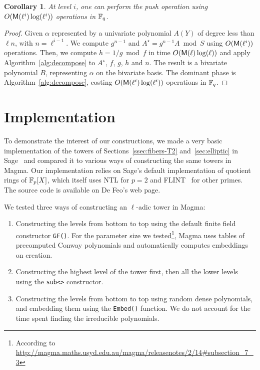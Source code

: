 \documentclass{sig-alternate}
\newtheorem{corollary}[definition]{Corollary}
\begin{document}
\begin{corollary}
  At level $i$, one can perform the push operation using
  $O(\mathsf{M}(\ell^i)\log(\ell^i))$ operations in $\mathbb{F}_q$.
\end{corollary}
\begin{proof}
  Given $\alpha$ represented by a univariate polynomial $A(Y)$ of
  degree less than $\ell n$, with $n =\ell^{i-1}$. We compute
  $g^{n-1}$ and $A^\star = g^{n-1} A \bmod S$ using $O(\mathsf{M}(\ell^i))$
  operations. Then, we compute $h=1/g \bmod f$ in time
  $O(\mathsf{M}(\ell)\log(\ell))$ and apply Algorithm~\ref{alg:decompose}
  to $A^\star$, $f$, $g$, $h$ and $n$. The result is a bivariate
  polynomial $B$, representing $\alpha$ on the bivariate basis. The
  dominant phase is Algorithm~\ref{alg:decompose}, costing
  $O(\mathsf{M}(\ell^i)\log(\ell^i))$ operations in $\mathbb{F}_q$.
\end{proof}


\section{Implementation}
\label{sec:impl}
To demonstrate the interest of our constructions, we made a very basic
implementation of the towers of Sections~\ref{ssec:fibers-T2}
and~\ref{sec:elliptic} in Sage~\cite{Sage} and compared it to various
ways of constructing the same towers in Magma. Our implementation
relies on Sage's default implementation of quotient rings of
$\mathbb{F}_p[X]$, which itself uses NTL \cite{shoup2003ntl} for $p=2$ and
FLINT~\cite{hart2010flint} for other primes. The source code is
available on De Feo's web page.

We tested three ways of constructing an $\ell$-adic tower in Magma:
\begin{enumerate}
\item Constructing the levels from bottom to top using the default
  finite field constructor \verb+GF()+. For the parameter size we
  tested\footnote{According to
    \url{http://magma.maths.usyd.edu.au/magma/releasenotes/2/14\#subsection_7_3}},
  Magma uses tables of precomputed Conway polynomials and
  automatically computes embeddings on creation.
\item Constructing the highest level of the tower first, then all the
  lower levels using the \verb+sub<>+ constructor.
\item Constructing the levels from bottom to top using random dense
  polynomials, and embedding them using the \verb+Embed()+
  function. We do not account for the time spent finding the
  irreducible polynomials.
\end{enumerate}
\end{document}
